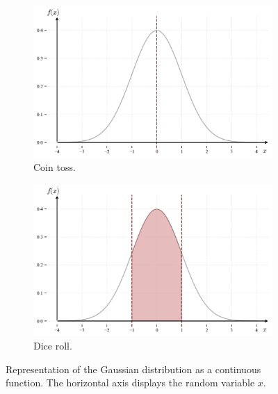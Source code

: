 \documentclass{book}
\begin{document}
\begin{figure}[ht]
    \centering
    \begin{subfigure}[b]{0.48\textwidth}
        \centering
        \includegraphics[width=\textwidth, height=0.7\textwidth]{figures/chapter2/gaussian_1.png}
        \caption{Coin toss.}
        \label{fig:gaussian1}
    \end{subfigure}
    \hfill
    \begin{subfigure}[b]{0.48\textwidth}
        \centering
        \includegraphics[width=\textwidth, height=0.7\textwidth]{figures/chapter2/gaussian_2.png}
        \caption{Dice roll.}
        \label{fig:gaussian2}
    \end{subfigure}
    \caption{Representation of the Gaussian distribution as a continuous function. The horizontal axis displays the random variable $x$.}
    \label{fig:gaussan_comparison}
\end{figure}
\end{document}

